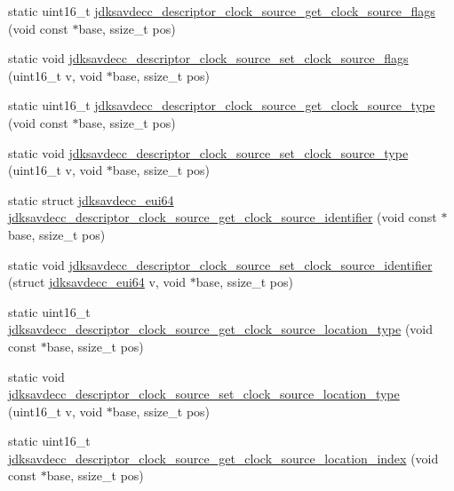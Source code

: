 \begin{DoxyCompactItemize}
static uint16\+\_\+t \hyperlink{group__descriptor__clock__source_ga446687533424c37008df2804641825cd}{jdksavdecc\+\_\+descriptor\+\_\+clock\+\_\+source\+\_\+get\+\_\+clock\+\_\+source\+\_\+flags} (void const $\ast$base, ssize\+\_\+t pos)
\item 
static void \hyperlink{group__descriptor__clock__source_ga0b8b7fe48eab69885a139bedad1ebc1f}{jdksavdecc\+\_\+descriptor\+\_\+clock\+\_\+source\+\_\+set\+\_\+clock\+\_\+source\+\_\+flags} (uint16\+\_\+t v, void $\ast$base, ssize\+\_\+t pos)
\item 
static uint16\+\_\+t \hyperlink{group__descriptor__clock__source_ga1d91d1447296699aa5ed39d00026e44e}{jdksavdecc\+\_\+descriptor\+\_\+clock\+\_\+source\+\_\+get\+\_\+clock\+\_\+source\+\_\+type} (void const $\ast$base, ssize\+\_\+t pos)
\item 
static void \hyperlink{group__descriptor__clock__source_ga4b0887f88881bcb2dbd7c3704e3ba877}{jdksavdecc\+\_\+descriptor\+\_\+clock\+\_\+source\+\_\+set\+\_\+clock\+\_\+source\+\_\+type} (uint16\+\_\+t v, void $\ast$base, ssize\+\_\+t pos)
\item 
static struct \hyperlink{structjdksavdecc__eui64}{jdksavdecc\+\_\+eui64} \hyperlink{group__descriptor__clock__source_ga67b1adbe7ed56cf9a954b3f888ac6dcc}{jdksavdecc\+\_\+descriptor\+\_\+clock\+\_\+source\+\_\+get\+\_\+clock\+\_\+source\+\_\+identifier} (void const $\ast$base, ssize\+\_\+t pos)
\item 
static void \hyperlink{group__descriptor__clock__source_ga815b6fc07de404da79ad7ba9239ab8a4}{jdksavdecc\+\_\+descriptor\+\_\+clock\+\_\+source\+\_\+set\+\_\+clock\+\_\+source\+\_\+identifier} (struct \hyperlink{structjdksavdecc__eui64}{jdksavdecc\+\_\+eui64} v, void $\ast$base, ssize\+\_\+t pos)
\item 
static uint16\+\_\+t \hyperlink{group__descriptor__clock__source_ga12d8acff7f2bb5f81d13e5c09dca830f}{jdksavdecc\+\_\+descriptor\+\_\+clock\+\_\+source\+\_\+get\+\_\+clock\+\_\+source\+\_\+location\+\_\+type} (void const $\ast$base, ssize\+\_\+t pos)
\item 
static void \hyperlink{group__descriptor__clock__source_ga18a32732cbc18f6b99c0b9d6d3b2785a}{jdksavdecc\+\_\+descriptor\+\_\+clock\+\_\+source\+\_\+set\+\_\+clock\+\_\+source\+\_\+location\+\_\+type} (uint16\+\_\+t v, void $\ast$base, ssize\+\_\+t pos)
\item 
static uint16\+\_\+t \hyperlink{group__descriptor__clock__source_gadf8261c84c76e70e1a884391e17b1f5b}{jdksavdecc\+\_\+descriptor\+\_\+clock\+\_\+source\+\_\+get\+\_\+clock\+\_\+source\+\_\+location\+\_\+index} (void const $\ast$base, ssize\+\_\+t pos)

\end{DoxyCompactItemize}

